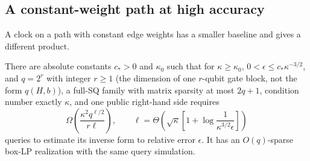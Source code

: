 \subsection{A constant-weight path at high accuracy}
A clock on a path with constant edge weights has a smaller baseline and
gives a different product.
\begin{theorem}\label{thm:path-product}
There are absolute constants $c_*>0$ and $\kappa_0$ such that for
$\kappa\geq\kappa_0$, $0<\epsilon\leq c_*\kappa^{-3/2}$, and
$q=2^r$ with integer $r\geq1$ (the dimension of one $r$-qubit gate
block, not the form $q(H,b)$), a full-SQ family with matrix sparsity
at most $2q+1$, condition number exactly $\kappa$, and one public right-hand
side requires
\begin{equation}\label{eq:path-product}
 \Omega\left(\frac{\kappa^2q^{\ell/2}}{r\ell}\right),\qquad
 \ell=\Theta\left(\sqrt\kappa
        \left[1+\log\frac1{\kappa^{3/2}\epsilon}\right]\right)
\end{equation}
queries to estimate its inverse form to relative error $\epsilon$. It has an
$O(q)$-sparse box-LP realization with the same query simulation.
\end{theorem}
